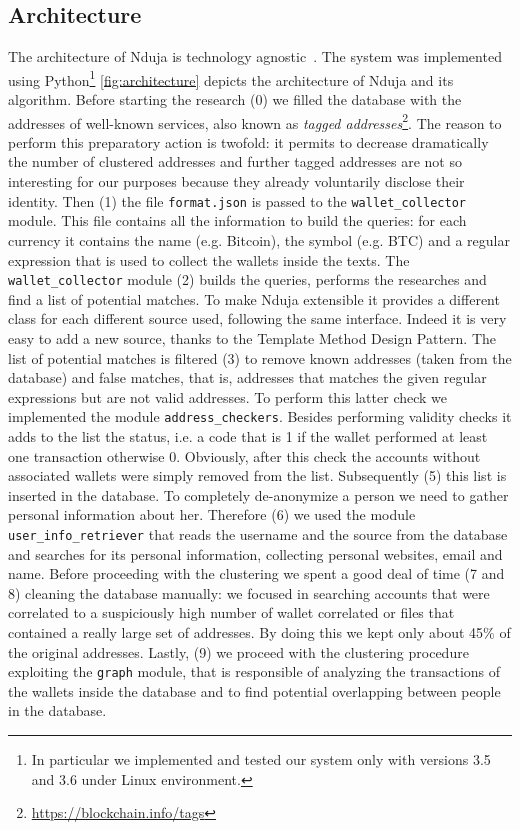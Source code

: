 \subsection{Architecture} \label{architecture}
The architecture of Nduja is technology agnostic~\cite{bib:art-of-scalability}.
The system was implemented using Python\footnote{
	In particular we implemented and tested our system only with versions
	3.5 and 3.6 under Linux environment.}
\autoref{fig:architecture} depicts the architecture of Nduja and its algorithm.
Before starting the research (0) we filled the database with the addresses of
well-known services, also known as
\emph{tagged addresses}\footnote{\url{https://blockchain.info/tags}}.
The reason to perform this preparatory action 
is twofold: it permits to decrease dramatically the number of
clustered addresses and further tagged addresses are not so
interesting for our purposes because they already voluntarily disclose their
identity.
Then (1) the file \texttt{format.json} is passed to the \verb|wallet_collector|
module. This file contains all the information to build the queries: for each
currency it contains the name (e.g. Bitcoin), the symbol (e.g. BTC) and a
regular expression that is used to collect the wallets inside the texts.
The \verb|wallet_collector| module (2) builds the queries, performs the
researches and find a list of potential matches. To make Nduja extensible it
provides a different class for each different source used, following the same
interface. Indeed it is very easy to add a new source, thanks to the Template
Method Design Pattern.
The list of potential matches is filtered (3) to remove known addresses (taken
from the database) and false matches, that is, addresses that matches the given
regular expressions but are not valid addresses. To perform this latter check
we implemented the module \verb|address_checkers|.
Besides performing validity checks it adds to the list the status, i.e. a
code that is 1 if the wallet performed at least one transaction otherwise 0.
Obviously, after this check the accounts without associated wallets were simply
removed from the list.
Subsequently (5) this list is inserted in the database.
To completely de-anonymize a person we need to gather personal information
about her. Therefore (6) we used the module \verb|user_info_retriever| that
reads the username and the source from the database and searches for its
personal information, collecting personal websites, email and name.
Before proceeding with the clustering we spent a good deal of time (7 and 8)
cleaning the database manually: we focused in searching accounts that were
correlated to a suspiciously high number of wallet correlated or files that
contained a really large set of addresses. By doing this we kept only about 45\%
of the original addresses.
Lastly, (9) we proceed with the clustering procedure exploiting the \verb|graph|
module, that is responsible of analyzing the transactions of the wallets 
inside the database and to find potential overlapping between people in the
database.

